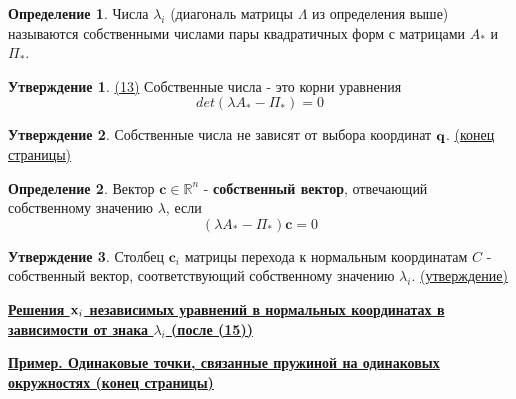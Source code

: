 \documentclass[specialist, subf, href, colorlinks=true, 12pt, times, mtpro, final]{disser}
\theoremstyle{definition}
\newtheorem{defn}{Определение}[section]
\newtheorem{state}{Утверждение}[section]
\begin{document}
	\begin{defn}
		Числа $\lambda_i$ (диагональ матрицы $\Lambda$ из определения выше) называются собственными числами пары квадратичных форм с матрицами $A_*$ и $\Pi_*$.
	\end{defn}  

	\begin{state}
		 \hyperlink {lects.12}{(13)} Собственные числа - это корни уравнения $$det (\lambda A_* - \Pi_*) = 0$$
	\end{state}

	\begin{state}
		Собственные числа не зависят от выбора координат $\mathbf{q}$. \hyperlink {lects.12}{(конец страницы)}
	\end{state} 

	\begin{defn}
		Вектор $\textbf{c} \in \mathbb{R}^n$ - \textbf{собственный вектор}, отвечающий собственному значению $\lambda$, если $$(\lambda A_* - \Pi_*)\textbf{c} = 0$$
	\end{defn} 

	\begin{state}
		Столбец $\textbf{c}_i$ матрицы  перехода к нормальным координатам $C$ - собственный вектор, соответствующий собственному значению $\lambda_i$. \hyperlink {lects.13}{(утверждение)}
	\end{state}  

	\bigskip
	\textbf{\hyperlink {lects.13}{Решения $\mathbf{x}_i$ независимых уравнений в нормальных координатах в зависимости от знака $\lambda_i$ (после (15))}}
	
	\bigskip
	\textbf{\hyperlink {lects.13}{Пример. Одинаковые точки, связанные пружиной на одинаковых окружностях (конец страницы)}}

	
    
\end{document}
